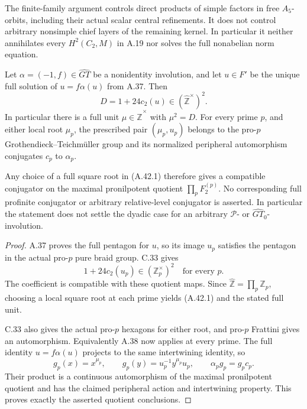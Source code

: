 The finite-family argument controls direct products
of simple factors in free \(A_5\)-orbits, including
their actual scalar central refinements. It does
not control arbitrary nonsimple chief layers of
the remaining kernel. In particular it neither
annihilates every \(H^2(C_2,M)\) in A.19 nor
solves the full nonabelian norm equation.

Let \(\alpha=(-1,f)\in\widehat{GT}\) be a
nonidentity involution, and let \(u\in F'\) be
the unique full solution of \(u=f\alpha(u)\)
from A.37. Then
\[
 D=1+24c_2(u)\in
          (\widehat{\mathbb Z}^{\times})^2.
 \tag{A.42.1}
\]
In particular there is a full unit
\(\mu\in\widehat{\mathbb Z}^{\times}\) with
\(\mu^2=D\). For every prime \(p\), and either
local root \(\mu_p\), the prescribed pair
\((\mu_p,u_p)\) belongs to the pro-\(p\)
Grothendieck--Teichm\"uller group and its
normalized peripheral automorphism conjugates
\(c_p\) to \(\alpha_p\).

Any choice of a full square root in (A.42.1)
therefore gives a compatible conjugator on the
maximal pronilpotent quotient
\(\prod_p F_2^{(p)}\). No corresponding full
profinite conjugator or arbitrary relative-level
conjugator is asserted. In particular the statement
does not settle the dyadic case for an arbitrary
\(\mathcal P\)- or \(\widehat{GT}_0\)-involution.

\begin{proof}
A.37 proves the full pentagon for \(u\), so its
image \(u_p\) satisfies the pentagon in the
actual pro-\(p\) pure braid group. C.33 gives
\[
              1+24c_2(u_p)\in(\mathbb Z_p^\times)^2
                  \quad\text{for every }p.
\]
The coefficient is compatible with these quotient
maps. Since
\(\widehat{\mathbb Z}=\prod_p\mathbb Z_p\),
choosing a local square root at each prime yields
(A.42.1) and the stated full unit.

C.33 also gives the actual pro-\(p\) hexagons
for either root, and pro-\(p\) Frattini gives
an automorphism. Equivalently A.38 now applies
at every prime. The full identity
\(u=f\alpha(u)\) projects to the same
intertwining identity, so
\[
       g_p(x)=x^{\mu_p},\qquad
       g_p(y)=u_p^{-1}y^{\mu_p}u_p,
       \qquad \alpha_p g_p=g_p c_p.
\]
Their product is a continuous automorphism of
the maximal pronilpotent quotient and has the
claimed peripheral action and intertwining
property. This proves exactly the asserted
quotient conclusions.
\end{proof}

